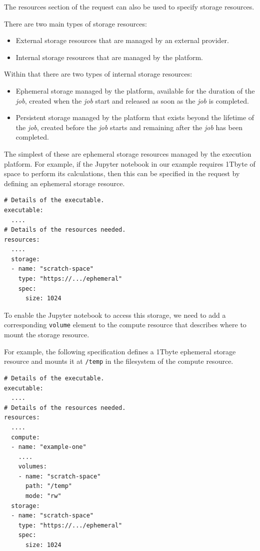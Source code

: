 \documentclass[11pt,a4paper]{ivoa}
\newcommand{\jupyternotebook} {Jupyter notebook}
\newcommand{\codeword}[1] {\texttt{#1}}
\newcommand{\job} {\textit{job}}
\begin{document}
The resources section of the request can also be used to specify storage resources.

There are two main types of storage resources:
\begin{itemize}
    \item External storage resources that are managed by an external provider.
    \item Internal storage resources that are managed by the platform.
\end{itemize}

Within that there are two types of internal storage resources:
\begin{itemize}
    \item Ephemeral storage managed by the platform, available for the duration of the \job{}, created when the \job{} start and released as soon as the \job{} is completed.
    \item Persistent storage managed by the platform that exists beyond the lifetime of the \job{}, created before the \job{} starts and remaining after the \job{} has been completed.
\end{itemize}

The simplest of these are ephemeral storage resources managed by the execution platform.
For example, if the \jupyternotebook{} in our example requires 1Tbyte of space to perform its calculations,
then this can be specified in the request by defining an ephemeral storage resource.

\begin{lstlisting}[]
# Details of the executable.
executable:
  ....
# Details of the resources needed.
resources:
  ....
  storage:
  - name: "scratch-space"
    type: "https://.../ephemeral"
    spec:
      size: 1024
\end{lstlisting}

To enable the \jupyternotebook{} to access this storage, we need to add a
corresponding \codeword{volume} element to the compute resource that describes
where to mount the storage resource.

For example, the following specification defines a 1Tbyte ephemeral storage resource
and mounts it at \codeword{/temp} in the filesystem of the compute resource.

\begin{lstlisting}[]
# Details of the executable.
executable:
  ....
# Details of the resources needed.
resources:
  ....
  compute:
  - name: "example-one"
    ....
    volumes:
    - name: "scratch-space"
      path: "/temp"
      mode: "rw"
  storage:
  - name: "scratch-space"
    type: "https://.../ephemeral"
    spec:
      size: 1024
\end{lstlisting}
\end{document}
